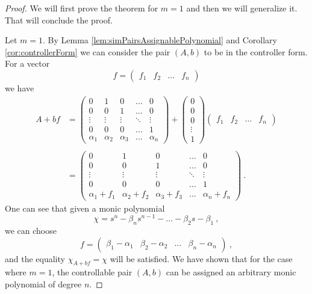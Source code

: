 \begin{proof}
    We will first prove the theorem for $m=1$ and then we will generalize it. That will conclude the proof.

    Let $m=1$. By Lemma \ref{lem:simPairsAssignablePolynomial} and Corollary \ref{cor:controllerForm} we can consider the pair $(A,b)$ to be in the controller form. For a vector 
    \begin{equation*}
        f=\begin{pmatrix}
            f_1&f_2&\ldots&f_n
        \end{pmatrix}
    \end{equation*}
    we have 
    \begin{align*}
        A+bf&=
        \begin{pmatrix}
			0 & 1 & 0 & \ldots & 0 \\
			0 & 0 & 1 & \ldots & 0 \\
			\vdots & \vdots & \vdots & \ddots & \vdots \\
			0 & 0 & 0 & \ldots & 1 \\
			\alpha_1 & \alpha_2 & \alpha_3 & \ldots & \alpha_n
        \end{pmatrix}
        +
        \begin{pmatrix}
            0 \\
            0 \\
            0 \\
            \vdots \\
            1
        \end{pmatrix}
        \begin{pmatrix}
            f_1&f_2&\ldots&f_n
        \end{pmatrix}
        \\
        \\
        &=
        \begin{pmatrix}
			0 & 1 & 0 & \ldots & 0 \\
			0 & 0 & 1 & \ldots & 0 \\
			\vdots & \vdots & \vdots & \ddots & \vdots \\
			0 & 0 & 0 & \ldots & 1 \\
            \alpha_1+f_1 & \alpha_2+f_2 & \alpha_3+f_3 & \ldots & \alpha_n+f_n
        \end{pmatrix}\ .
    \end{align*}
    One can see that given a monic polynomial
    $$\chi=s^n-\beta_ns^{n-1}-\ldots-\beta_2s-\beta_1\ ,$$
    we can choose
    $$f=\begin{pmatrix}
        \beta_1-\alpha_1&\beta_2-\alpha_2&\ldots&\beta_n-\alpha_n
    \end{pmatrix}\ ,$$
    and the equality $\chi_{A+bf}=\chi$ will be satisfied. We have shown that for the case where $m=1$, the controllable pair $(A,b)$ can be assigned an arbitrary monic polynomial of degree $n$.


\end{proof}
